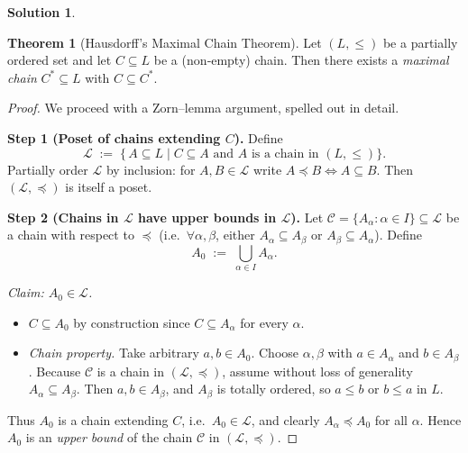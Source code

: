 \documentclass[12pt]{article}
\theoremstyle{definition} %
\newtheorem{solution}{Solution}
\newtheorem{theorem}{Theorem}
\theoremstyle{plain} %
\begin{document}
    \begin{solution}
      \begin{theorem}[Hausdorff’s Maximal Chain Theorem]
        \label{thm:max-chain}
        Let $(L,\le)$ be a partially ordered set and let $C\subseteq L$ be a
        (non‑empty) chain.  
        Then there exists a \emph{maximal chain}
        $C^{\ast}\subseteq L$ with $C\subseteq C^{\ast}$.
        \end{theorem}
        
        \begin{proof}
        We proceed with a Zorn–lemma argument, spelled out in detail.
        
        \bigskip
        \textbf{Step 1 (Poset of chains extending $C$).}
        Define
        \[
          \mathcal L
          \;:=\;
          \bigl\{\,A\subseteq L \mid C\subseteq A
                  \text{ and $A$ is a chain in }(L,\le)\bigr\}.
        \]
        Partially order $\mathcal L$ by inclusion:
        for $A,B\in\mathcal L$ write
        $A\preceq B \iff A\subseteq B$.
        Then $(\mathcal L,\preceq)$ is itself a poset.
        
        \bigskip
        \textbf{Step 2 (Chains in $\mathcal L$ have upper bounds in
        $\mathcal L$).}
        Let
        \(
          \mathcal C=\{A_\alpha : \alpha\in I\}\subseteq\mathcal L
        \)
        be a chain with respect to $\preceq$ (i.e.\ $\forall\alpha,\beta$,
        either $A_\alpha\subseteq A_\beta$ or $A_\beta\subseteq A_\alpha$).
        Define
        \[
          A_0 \;:=\; \bigcup_{\alpha\in I} A_\alpha.
        \]
        
        \emph{Claim: $A_0\in\mathcal L$.}
        
        \begin{itemize}
          \item $C\subseteq A_0$ by construction since $C\subseteq A_\alpha$
                for every $\alpha$.
          \item \emph{Chain property.}  
                Take arbitrary $a,b\in A_0$.
                Choose $\alpha,\beta$ with $a\in A_\alpha$ and $b\in A_\beta$.
                Because $\mathcal C$ is a chain in $(\mathcal L,\preceq)$,
                assume without loss of generality $A_\alpha\subseteq A_\beta$.
                Then $a,b\in A_\beta$, and $A_\beta$ is totally ordered,
                so $a\le b$ or $b\le a$ in $L$.
        \end{itemize}
        Thus $A_0$ is a chain extending $C$, i.e.\ $A_0\in\mathcal L$,
        and clearly $A_\alpha\preceq A_0$ for all $\alpha$.
        Hence $A_0$ is an \emph{upper bound} of the chain $\mathcal C$
        in $(\mathcal L,\preceq)$.
        

\end{proof}
\end{solution}
\end{document}

